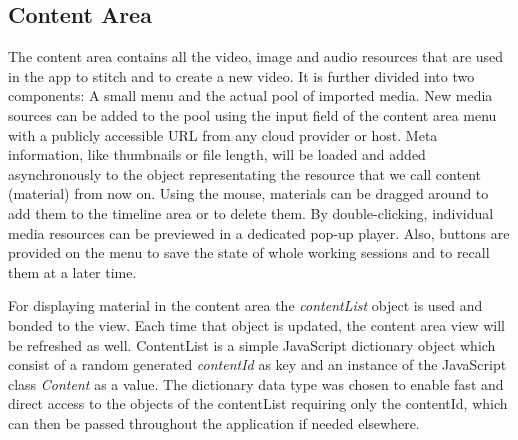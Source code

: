 \documentclass[conference]{IEEEtran}
\begin{document}
\subsection{Content Area}
The content area contains all the video, image and audio resources that are used in the app to stitch and to create a new video.
It is further divided into two components: A small menu and the actual pool of imported media.
New media sources can be added to the pool using the input field of the content area menu with a publicly accessible URL from any cloud provider or host.
Meta information, like thumbnails or file length, will be loaded and added asynchronously to the object representating the resource that we call content (material) from now on.
Using the mouse, materials can be dragged around to add them to the timeline area or to delete them.
By double-clicking, individual media resources can be previewed in a dedicated pop-up player.
Also, buttons are provided on the menu to save the state of whole working sessions and to recall them at a later time.

For displaying material in the content area the \textit{contentList} object is used and bonded to the view.
Each time that object is updated, the content area view will be refreshed as well.
ContentList is a simple JavaScript dictionary object which consist of a random generated \textit{contentId} as key and an instance of the JavaScript class \textit{Content} as a value.
The dictionary data type was chosen to enable fast and direct access to the objects of the contentList requiring only the contentId, which can then be passed throughout the application if needed elsewhere.
\end{document}
